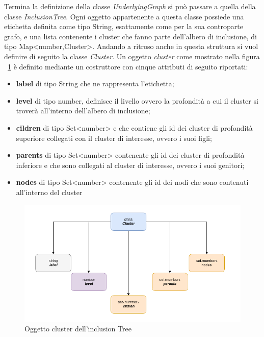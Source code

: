 {Termina la definizione della classe \textit{UnderlyingGraph} si può passare a quella della classe \textit{InclusionTree}. Ogni oggetto appartenente a questa classe possiede una etichetta definita come tipo String, esattamente come per la sua controparte grafo, e una lista contenente i cluster che fanno parte dell'albero di inclusione, di tipo Map<number,Cluster>.
Andando a ritroso anche in questa struttura si vuol definire di seguito la classe \textit{Cluster}.
Un oggetto \textit{cluster} come mostrato nella figura \figurename~\ref{fig:clusterClass} è definito mediante un costruttore con cinque attributi di seguito riportati:
\begin{itemize}
	\item \textbf{label} di tipo String che ne rappresenta l'etichetta;
	\item \textbf{level} di tipo number, definisce il livello ovvero la profondità a cui il cluster si troverà all'interno dell'albero di inclusione;
	\item \textbf{cildren} di tipo Set<number> e che contiene gli id dei cluster di profondità superiore collegati con il cluster di interesse, ovvero i suoi figli;
	\item \textbf{parents} di tipo Set<number> contenente gli id dei cluster di profondità inferiore e che sono collegati al cluster di interesse, ovvero i suoi genitori;
	\item \textbf{nodes} di tipo Set<number> contenente gli id dei nodi che sono contenuti all'interno del cluster
\end{itemize}

\begin{figure}[!htb]
	\begin{center}
		\includegraphics[width=1 \linewidth]{figure/clusterClass}
	\end{center}
	\caption{Oggetto cluster dell'inclusion Tree\label{fig:clusterClass}}
\end{figure}
}
